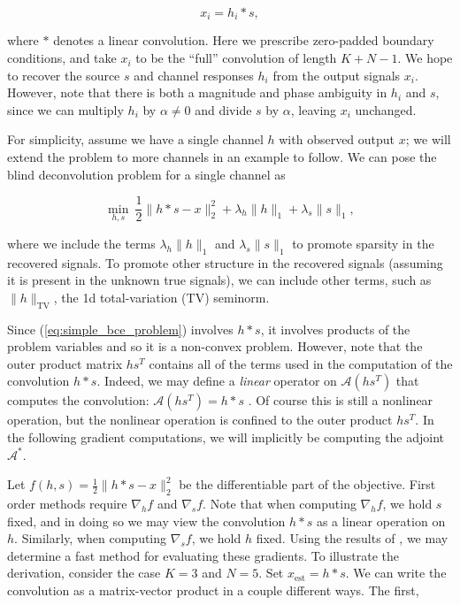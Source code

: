 \documentclass[journal]{IEEEtran}
\begin{document}
\[ x_i = h_i\ast s, \] 

\noindent where $\ast$ denotes a linear convolution.  Here we prescribe zero-padded boundary conditions, and take $x_i$ to be the ``full'' convolution of length $K+N-1$.  We hope to recover the source $s$ and channel responses $h_i$ from the output signals $x_i$.   However, note that there is both a magnitude and phase ambiguity in $h_i$ and $s$, since we can multiply $h_i$ by $\alpha\neq 0$ and divide $s$ by $\alpha$, leaving $x_i$ unchanged.

For simplicity, assume we have a single channel $h$ with observed output $x$; we will extend the problem to more channels in an example to follow.  We can pose the blind deconvolution problem for a single channel as

\begin{equation}
\label{eq:simple_bce_problem}
\min_{h,s}~ \frac{1}{2}\|h\ast s-x\|_2^2 + \lambda_h\|h\|_1 + \lambda_s \|s\|_1,
\end{equation}

\noindent where we include the terms $\lambda_h\|h\|_1$ and $\lambda_s\|s\|_1$ to promote sparsity in the recovered signals.  To promote other structure in the recovered signals (assuming it is present in the unknown true signals), we can include other terms, such as $\|h\|_\text{TV}$, the 1d total-variation (TV) seminorm.

Since (\ref{eq:simple_bce_problem}) involves $h\ast s$, it involves products of the problem variables and so it is a non-convex problem.  However, note that the outer product matrix $hs^T$ contains all of the terms used in the computation of the convolution $h\ast s$.  Indeed, we may define a \emph{linear} operator on $\mathcal{A}(hs^T)$ that computes the convolution: $\mathcal{A}(hs^T)=h\ast s$ \cite{ahmed_2013}.  Of course this is still a nonlinear operation, but the nonlinear operation is confined to the outer product $hs^T$.  In the following gradient computations, we will implicitly be computing the adjoint $\mathcal{A}^\ast$.

Let $f(h,s)=\frac{1}{2}\|h\ast s -x\|_2^2$ be the differentiable part of the objective.  First order methods require $\nabla_hf$ and $\nabla_sf$.  Note that when computing $\nabla_hf$, we hold $s$ fixed, and in doing so we may view the convolution $h\ast s$ as a linear operation on $h$.  Similarly, when computing $\nabla_s f$, we hold $h$ fixed.  Using the results of \cite{claerbout_1992}, we may determine a fast method for evaluating these gradients.  To illustrate the derivation, consider the case $K=3$ and $N=5$.  Set $x_\text{est}=h\ast s$.  We can write the convolution as a matrix-vector product in a couple different ways.  The first,
\end{document}
